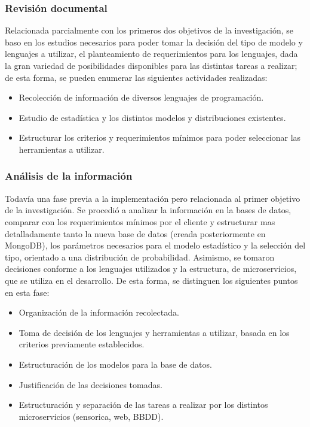 \subsubsection{Revisión documental}
Relacionada parcialmente con los primeros dos objetivos de la investigación,
se baso en los estudios necesarios para poder tomar la decisión del tipo de modelo
y lenguajes a utilizar, el planteamiento de requerimientos para los
lenguajes, dada la gran variedad de posibilidades disponibles para las distintas
tareas a realizar; de esta forma, se pueden enumerar las siguientes actividades
realizadas:

\begin{itemize}
    \item Recolección de información de diversos lenguajes de programación.
    \item Estudio de estadística y los distintos modelos y distribuciones existentes.
    \item Estructurar los criterios y requerimientos mínimos para poder seleccionar
        las herramientas a utilizar.
\end{itemize}

\subsubsection{Análisis de la información}
Todavía una fase previa a la implementación pero relacionada al primer objetivo
de la investigación. Se procedió a analizar la información en la bases de datos,
comparar con los requerimientos mínimos por el cliente y estructurar mas detalladamente
tanto la nueva base de datos (creada posteriormente en MongoDB), los parámetros
necesarios para el modelo estadístico y la selección del tipo, orientado a una
distribución de probabilidad. Asimismo, se tomaron decisiones conforme a los
lenguajes utilizados y la estructura, de microservicios, que se utiliza en el
desarrollo. De esta forma, se distinguen los siguientes puntos en esta fase:

\begin{itemize}
    \item Organización de la información recolectada.
    \item Toma de decisión de los lenguajes y herramientas a utilizar, basada
        en los criterios previamente establecidos.
    \item Estructuración de los modelos para la base de datos.
    \item Justificación de las decisiones tomadas.
    \item Estructuración y separación de las tareas a realizar por los distintos
        microservicios (sensorica, web, BBDD).
\end{itemize}

